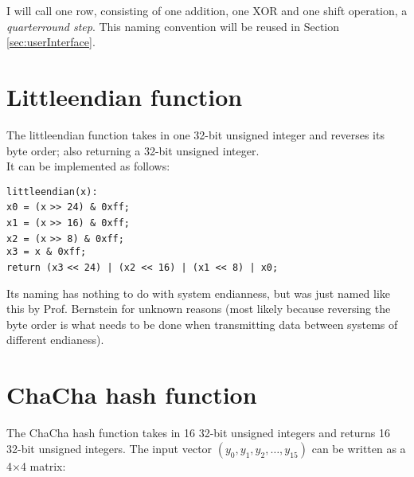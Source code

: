 I will call one row, consisting of one addition, one XOR and one shift operation, a \textit{quarterround step}. This naming convention will be reused in Section \ref{sec:userInterface}.

\section{Littleendian function}
\label{sec:chacha.littleendian}

The littleendian function takes in one 32-bit unsigned integer and reverses its byte order; also returning a 32-bit unsigned integer.  \\
It can be implemented as follows:

\begin{center}
\begin{minipage}{0.8\linewidth}
\texttt{littleendian(x):} \\
\hspace*{1em}\texttt{x0 = (x} \verb|>>|\texttt{ 24) \& 0xff;} \\
\hspace*{1em}\texttt{x1 = (x} \verb|>>|\texttt{ 16) \& 0xff;} \\
\hspace*{1em}\texttt{x2 = (x} \verb|>>|\texttt{ 8) \& 0xff;} \\
\hspace*{1em}\texttt{x3 = x \& 0xff;} \\
\hspace*{1em}\texttt{return (x3} \verb|<<|\texttt{ 24) | (x2 }\verb|<<|\texttt{ 16) | (x1 }\verb|<<|\texttt{ 8) | x0;}
\end{minipage}
\end{center}

\begin{remark}
Its naming has nothing to do with system endianness, but was just named like this by Prof. Bernstein for unknown reasons (most likely because reversing the byte order is what needs to be done when transmitting data between systems of different endianess).
\end{remark}

\section{ChaCha hash function}
\label{sec:chacha.hash}

The ChaCha hash function takes in 16 32-bit unsigned integers and returns 16 32-bit unsigned integers. The input vector $(y_0, y_1, y_2, \dots, y_{15})$ can be written as a 4$\times$4 matrix:

